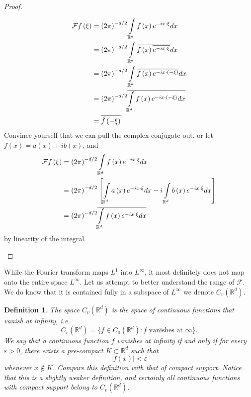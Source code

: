 \documentclass[letterpaper,twoside,12pt]{article}
\theoremstyle{mystyle}
\newtheorem{definition}{Definition}[section]
\newcommand{\R}{{\mathbb R}}
\newcommand{\cg}{\color{gray}}
\newcommand{\cbk}{\color{black}}
\begin{document}
\begin{proof}
\begin{enumerate}
\begin{align*}
      \mathcal{F}\bar f\left( \xi  \right) &= {\left( {2\pi } \right)^{ - d/2}}\int\limits_{{\mathbb{R}^d}} {\bar f\left( x \right){e^{ - ix \cdot \xi }}dx}  \hfill \\
       &= {\left( {2\pi } \right)^{ - d/2}}\int\limits_{{\mathbb{R}^d}} {\overline {f\left( x \right)\overline {{e^{ - ix \cdot \xi }}} } dx}  \hfill \\
       &= {\left( {2\pi } \right)^{ - d/2}}\int\limits_{{\mathbb{R}^d}} {\overline {f\left( x \right){e^{ - ix \cdot \left( { - \xi } \right)}}} dx}  \hfill \\
       &= {\left( {2\pi } \right)^{ - d/2}}\overline {\int\limits_{{\mathbb{R}^d}} {f\left( x \right){e^{ - ix \cdot \left( { - \xi } \right)}}dx} }  \hfill \\
       &= \overline {\hat f\left( { - \xi } \right)} 
      \end{align*}
      Convince yourself that we can pull the complex conjugate out, or let $f(x) = a(x) + ib(x)$, and 
      \begin{align*}
        \mathcal{F}\bar f\left( \xi  \right) &= {\left( {2\pi } \right)^{ - d/2}}\int\limits_{{\mathbb{R}^d}} {\bar f\left( x \right){e^{ - ix \cdot \xi }}dx}  \hfill \\
         &= {\left( {2\pi } \right)^{ - d/2}}\left[ {\int\limits_{{\mathbb{R}^d}} {a\left( x \right){e^{ - ix \cdot \xi }}dx}  - i\int\limits_{{\mathbb{R}^d}} {b\left( x \right){e^{ - ix \cdot \xi }}dx} } \right] \hfill \\
         &= {\left( {2\pi } \right)^{ - d/2}}\overline {\int\limits_{{\mathbb{R}^d}} {f\left( x \right){e^{ - ix \cdot \xi }}dx} } 
      \end{align*}
      by linearity of the integral. 
  \end{enumerate}
\end{proof}
While the Fourier transform maps $L^1$ into $L^\infty$, it most definitely does not map onto the entire space $L^\infty$. Let us attempt to better understand the range of $\mathcal F$. We do know that it is contained fully in a subspace of $L^\infty$ we denote $C_v\left( \R^d \right)$. 
\begin{definition}
  The space $C_v\left( \R^d \right)$ is the space of continuous functions that vanish at infinity, i.e. 
  \[C_v\left( \R^d \right) = \{f \in C_0\left( \R^d \right) : f\text{ vanishes at }\infty\}.\]
  We say that a continuous function $f$ vanishes at infinity if and only if for every $\varepsilon>0$, there exists a pre-compact $K \subset \R^d$ such that 
  \[|f(x)| < \varepsilon\] whenever $x \notin K$. \cg Compare this definition with that of compact support. Notice that this is a slightly weaker definition, and certainly all continuous functions with compact support belong to $C_v\left( \R^d \right)$. \cbk 
\end{definition}
\end{document}
